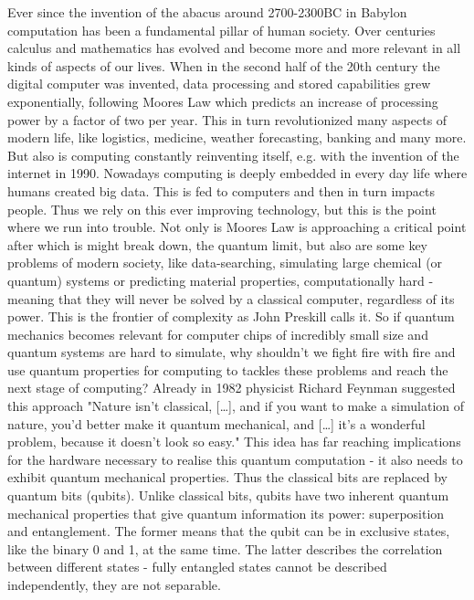 Ever since the invention of the abacus around 2700-2300BC in Babylon \cite{abacus} computation has been a fundamental pillar of human society. Over centuries calculus and mathematics has evolved and become more and more relevant in all kinds of aspects of our lives. When in the second half of the 20th century the digital computer was invented, data processing and stored capabilities grew exponentially, following Moores Law which predicts an increase of processing power by a factor of two per year. \cite{MooresLaw} This in turn revolutionized many aspects of modern life, like logistics, medicine, weather forecasting, banking and many more. But also is computing constantly reinventing itself, e.g. with the invention of the internet in 1990. \cite{The conversation https://theconversation.com/the-history-of-computing-is-both-evolution-and-revolution-57126 } Nowadays computing is deeply embedded in every day life where humans created big data. This is fed to computers and then in turn impacts people. Thus we rely on this ever improving technology, but this is the point where we run into trouble. Not only is Moores Law is approaching a critical point after which is might break down, the quantum limit, but also are some key problems of modern society, like data-searching, simulating large chemical (or quantum) systems or predicting material properties, computationally hard - meaning that they will never be solved by a classical computer, regardless of its power. 
This is the frontier of complexity as John Preskill calls it. \cite{JohnPreskillNasa}
So if quantum mechanics becomes relevant for computer chips of incredibly small size and quantum systems are hard to simulate, why shouldn't we fight fire with fire and use quantum properties for computing to tackles these problems and reach the next stage of computing?
Already in 1982 physicist Richard Feynman suggested this approach "Nature isn't classical, […], and if you want to make a simulation of nature, you'd better make it quantum mechanical, and […] it's a wonderful problem, because it doesn't look so easy." This idea has far reaching implications for the hardware necessary to realise this quantum computation - it also needs to exhibit quantum mechanical properties. Thus the classical bits are replaced by quantum bits (qubits). Unlike classical bits,  qubits have two inherent quantum mechanical properties that give quantum information its power: superposition and entanglement. The former means that the qubit can be in exclusive states, like the binary 0 and 1, at the same time. The latter describes the correlation between different states - fully entangled states cannot be described independently, they are not separable. 
